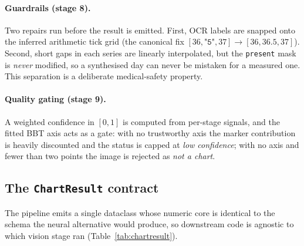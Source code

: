 \documentclass[11pt,a4paper]{article}
\newcommand{\code}[1]{\texttt{\small #1}}
\begin{document}
\paragraph{Guardrails (stage 8).}
Two repairs run before the result is emitted. First, OCR labels are snapped
onto the inferred arithmetic tick grid (the canonical fix
$[36, \texttt{"5"}, 37] \rightarrow [36, 36.5, 37]$). Second, short gaps in
each series are linearly interpolated, but the \code{present} mask is
\emph{never} modified, so a synthesised day can never be mistaken for a
measured one. This separation is a deliberate medical-safety property.

\paragraph{Quality gating (stage 9).}
A weighted confidence in $[0,1]$ is computed from per-stage signals, and the
fitted BBT axis acts as a gate: with no trustworthy axis the marker contribution
is heavily discounted and the status is capped at \emph{low confidence}; with no
axis and fewer than two points the image is rejected as \emph{not a chart}.

\subsection{The \texttt{ChartResult} contract}
The pipeline emits a single dataclass whose numeric core is identical to the
schema the neural alternative would produce, so downstream code is agnostic to
which vision stage ran (Table~\ref{tab:chartresult}).
\end{document}
